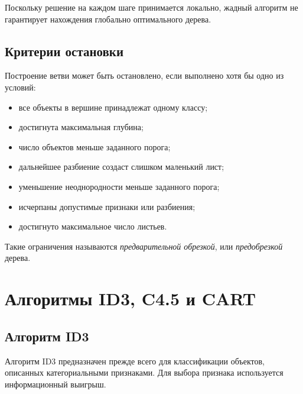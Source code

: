 \documentclass[12pt,a4paper]{article}
\theoremstyle{plain}
\theoremstyle{definition}
\theoremstyle{remark}
\begin{document}
Поскольку решение на каждом шаге принимается локально, жадный алгоритм
не гарантирует нахождения глобально оптимального дерева.

\subsection{Критерии остановки}

Построение ветви может быть остановлено, если выполнено хотя бы одно из
условий:
\begin{itemize}
    \item все объекты в вершине принадлежат одному классу;
    \item достигнута максимальная глубина;
    \item число объектов меньше заданного порога;
    \item дальнейшее разбиение создаст слишком маленький лист;
    \item уменьшение неоднородности меньше заданного порога;
    \item исчерпаны допустимые признаки или разбиения;
    \item достигнуто максимальное число листьев.
\end{itemize}

Такие ограничения называются \emph{предварительной обрезкой}, или
\emph{предобрезкой} дерева.

\section{Алгоритмы ID3, C4.5 и CART}

\subsection{Алгоритм ID3}

Алгоритм ID3 предназначен прежде всего для классификации объектов,
описанных категориальными признаками. Для выбора признака используется
информационный выигрыш.
\end{document}

